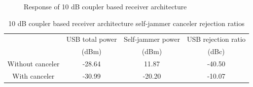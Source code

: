 \documentclass[12pt,onecolumn,titlepage]{article}
\begin{document}
\begin{figure}[h!]
	\centering
		\quad
	\label{fig:orig_Rx_10dBcoup}
	\caption{Response of 10 dB coupler based receiver architecture}
\end{figure}

\begin{table}[h!]
\centering
	\caption{10 dB coupler based receiver architecture self-jammer canceler rejection ratios}
	\begin{tabular}{| c | c | c || c |}
	\hline
	 & USB total power & Self-jammer power  & USB rejection ratio  \\
	 & (dBm) & (dBm) & (dBc) \\ \hline
	 Without canceler & -28.64 & 11.87 & -40.50 \\ \hline
	 With canceler & -30.99 & -20.20 & -10.07 \\ \hline
	\end{tabular}
\label{tab:orig_Rx_architecture_rejection_10dBcoup}
\end{table}


\clearpage
\end{document}
